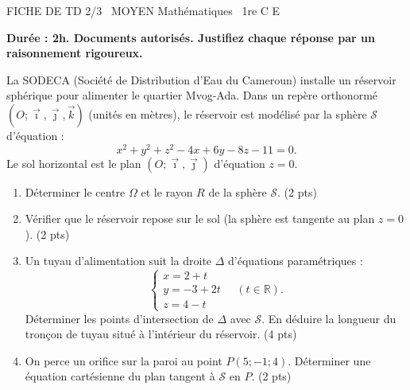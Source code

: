 \documentclass[11pt]{article}
\begin{document}
\begin{tcolorbox}[enhanced,colback=popink,colframe=popink,arc=10pt,boxrule=0pt,left=12pt,right=12pt,top=9pt,bottom=9pt]
{\color{white}\popxbold\small FICHE DE TD 2/3 \textbullet\ MOYEN \hfill Mathématiques \textbullet\ 1re C E\par}
\end{tcolorbox}
\vspace{4pt}
\textbf{Durée : 2h. Documents autorisés. Justifiez chaque réponse par un raisonnement rigoureux.}

\begin{exercice}
La SODECA (Société de Distribution d'Eau du Cameroun) installe un réservoir sphérique pour alimenter le quartier Mvog-Ada. Dans un repère orthonormé $(O;\vec{\imath},\vec{\jmath},\vec{k})$ (unités en mètres), le réservoir est modélisé par la sphère $\mathcal{S}$ d'équation :
\[
x^2 + y^2 + z^2 - 4x + 6y - 8z - 11 = 0.
\]
Le sol horizontal est le plan $(O;\vec{\imath},\vec{\jmath})$ d'équation $z=0$.
\begin{enumerate}
    \item Déterminer le centre $\Omega$ et le rayon $R$ de la sphère $\mathcal{S}$. \hfill (2 pts)
    \item Vérifier que le réservoir repose sur le sol (la sphère est tangente au plan $z=0$). \hfill (2 pts)
    \item Un tuyau d'alimentation suit la droite $\Delta$ d'équations paramétriques :
    \[
    \begin{cases}
    x = 2 + t \\
    y = -3 + 2t \\
    z = 4 - t
    \end{cases}
    \quad (t \in \mathbb{R}).
    \]
    Déterminer les points d'intersection de $\Delta$ avec $\mathcal{S}$. En déduire la longueur du tronçon de tuyau situé à l'intérieur du réservoir. \hfill (4 pts)
    \item On perce un orifice sur la paroi au point $P(5; -1; 4)$. Déterminer une équation cartésienne du plan tangent à $\mathcal{S}$ en $P$. \hfill (2 pts)
\end{enumerate}
\end{exercice}
\end{document}
